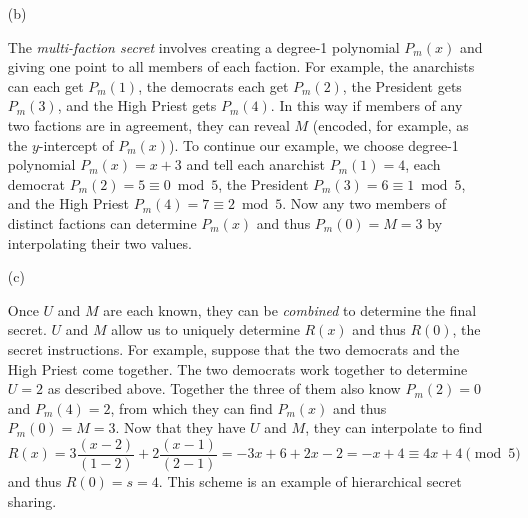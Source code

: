 \documentclass[]{article}
\begin{document}
\begin{qunlist}
{{\begin{enumerate}
The \textit{unanimity secret} involves creating a separate secret for each faction. We will require all members of that faction to join forces in order to reveal the secret. For example, the anarchists will each have distinct points of a degree-3 polynomial and the democrats will each have distinct points of a degree-1 polynomial. When all members of a faction come together, they will reveal $U$ (encoded, for example, as the $y$-intercept of each of these polynomials). Note that the President and the High Priest will each be told $U$ directly since they are the only members of their faction.
On the other hand, the democrats will each have a point on the degree-1 polynomial $P_d(x)$. Suppose $P_d(x) = 2x+2$. Then the first democrat receives $P_d(1) = 4$ and the second receives $P_d(2) = 4+2 = 6 \equiv 1 \bmod 5$. When they interpolate using these values, they will discover the original polynomial and therefore $P_d(0) = U = 2$. The anarchists will have a similar secret but with a degree-3 polynomial (e.g. $P_a(x) = 4x^3 + x^2 + 2$).

\item[(b)]

The \textit{multi-faction secret} involves creating a degree-1 polynomial $P_m(x)$ and giving one point to all members of each faction. For example, the anarchists can each get $P_m(1)$, the democrats each get $P_m(2)$, the President gets $P_m(3)$, and the High Priest gets $P_m(4)$. In this way if members of any two factions are in agreement, they can reveal $M$ (encoded, for example, as the $y$-intercept of $P_m(x)$). To continue our example, we choose degree-1 polynomial $P_m(x) = x+3$ and tell each anarchist $P_m(1)=4$, each democrat $P_m(2)=5\equiv0 \bmod 5$, the President $P_m(3)=6 \equiv 1 \bmod 5$, and the High Priest $P_m(4) = 7 \equiv 2 \bmod 5$. Now any two members of distinct factions can determine $P_m(x)$ and thus $P_m(0) = M = 3$ by interpolating their two values.

\item[(c)]

Once $U$ and $M$ are each known, they can be \textit{combined} to determine the final secret. $U$ and $M$ allow us to uniquely determine $R(x)$ and thus $R(0)$, the secret instructions. For example, suppose that the two democrats and the High Priest come together. The two democrats work together to determine $U=2$ as described above. Together the three of them also know $P_m(2)=0$ and $P_m(4)=2$, from which they can find $P_m(x)$ and thus $P_m(0) = M=3$. Now that they have $U$ and $M$, they can interpolate to find 
\[ R(x) = 3 \frac{(x-2)}{(1-2)} + 2 \frac{(x-1)}{(2-1)} = -3x+6 + 2x-2 = -x + 4 \equiv 4x + 4 \pmod 5 \]
and thus $R(0) = s = 4$. This scheme is an example of hierarchical secret sharing. 


\end{enumerate}}}
\end{qunlist}
\end{document}
